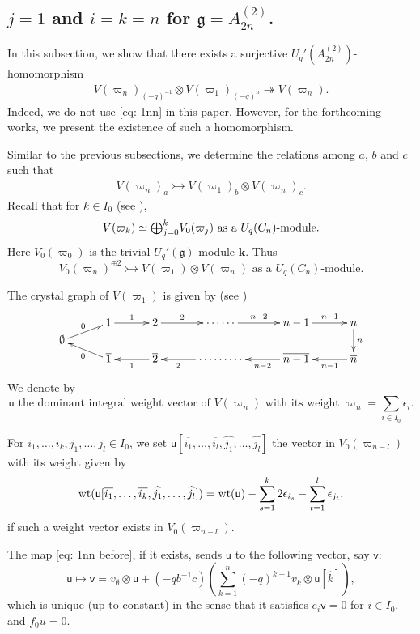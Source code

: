 \documentclass[11pt, leqno]{amsart}
\theoremstyle{definition}
\numberwithin{equation}{section}
\begin{document}
\subsection{$j=1$ and $i=k=n$ for ${\mathfrak g}=A^{(2)}_{2n}$.} In this subsection, we show that there exists a surjective $U_q'(A^{(2)}_{2n})$-homomorphism
\begin{align} \label{eq: 1nn}
 V({\varpi}_{n})_{(-q)^{-1}} \otimes V({\varpi}_{1})_{(-q)^{n}} \twoheadrightarrow V({\varpi}_{n}).
\end{align}
Indeed, we do not use \eqref{eq: 1nn} in this paper. However, for the forthcoming works, we present the existence of such a homomorphism.

Similar to the previous subsections, we determine the relations among $a$, $b$ and $c$ such that
\begin{align} \label{eq: 1nn before}
V({\varpi}_{n})_a \rightarrowtail V({\varpi}_{1})_b \otimes V({\varpi}_{n})_c.
\end{align}
Recall that for $k \in I_0$ (see \cite[Table 1]{OS08}),
$$ V({\varpi}_k) \simeq {\mathop{\mbox{\normalsize$\bigoplus$}}\limits}_{j=0}^{k} V_0({\varpi}_j) \text{ as a $U_q(C_n)$-module.} $$
Here $V_0({\varpi}_0)$ is the trivial ${U_q'({\mathfrak g})}$-module ${\mathbf{k}}$. Thus
$$ \text{$V_0({\varpi}_n)^{\oplus 2} \rightarrowtail V({\varpi}_{1}) \otimes V({\varpi}_{n})$ as a $U_q(C_n)$-module.}$$

The crystal graph of $V({\varpi}_1)$ is given by (see \cite[Example 11.1.4]{HK02})
$$\xymatrix@C=7ex@R=0.5ex{
&1\ar[r]^-{1}&2\ar[r]^-{2}&\cdots\cdots\ar[r]^-{n-2}
&n-1\ar[r]^-{n-1}&n \ar[dd]^-{n}\\
\emptyset\ar[ur]^-{0}&&\\
&\overline{1}\ar[ul]^-{0}&
\overline{2}\ar[l]^-{1}&\cdots\cdots\cdots\ar[l]^-{2}&\overline{n-1}\ar[l]^-{n-2}
&\overline{n}\ar[l]^-{n-1}
}
$$
We denote by $$  \text{$\mathsf{u}$ the dominant integral weight vector of $V({\varpi}_n)$ with its weight ${\varpi}_n=\sum_{i \in I_0} \epsilon_i$.}$$

For $i_1,\ldots,i_k,j_1,\ldots,j_l \in I_0$, we set
$\mathsf{u}[\overline{i_1},\ldots,\overline{i_l},\widehat{j_1},\ldots,\widehat{j_l}]$ the vector in $V_0({\varpi}_{n-l})$ with
its weight given by
$$ {\rm wt}(\mathsf{u}[\overline{i_1},\ldots,\overline{i_k},\widehat{j_1},\ldots,\widehat{j_l}])={\rm wt}(\mathsf{u})-\sum_{s=1}^{k}2\epsilon_{i_s}-\sum_{t=1}^{l}\epsilon_{j_t},$$
if such a weight vector exists in $V_0({\varpi}_{n-l})$.

The map \eqref{eq: 1nn before}, if it exists, sends $\mathsf{u}$ to the following vector, say $\mathsf{v}$:
$$ \mathsf{u} \longmapsto \mathsf{v} =
v_{\emptyset} \otimes \mathsf{u} + (-qb^{-1}c)\left( \sum_{k=1}^n
(-q)^{k-1} v_k \otimes \mathsf{u}[\widehat{k}]\right),$$ which is
unique (up to constant) in the sense that it satisfies $e_i
\mathsf{v}=0$ for $i \in I_0$, and $f_0 u=0$.
\end{document}
